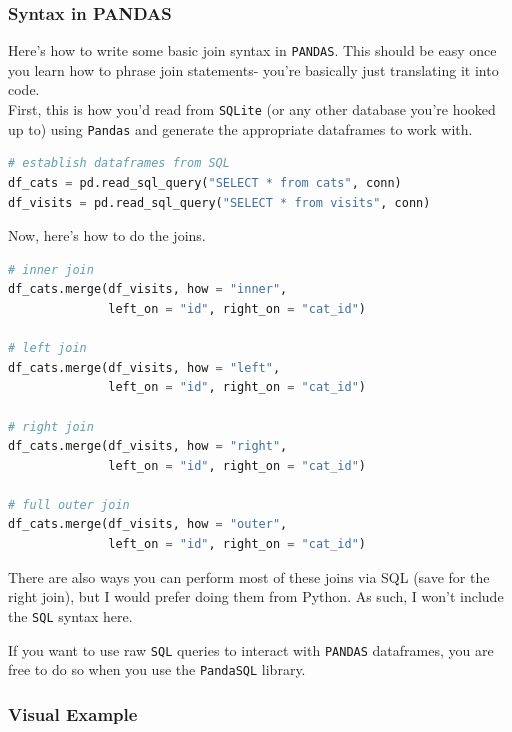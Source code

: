 \documentclass[english, 10pt]{article}
\begin{document}
\subsubsection{Syntax in PANDAS}

Here's how to write some basic join syntax in \texttt{PANDAS}. This should be easy once you learn how to phrase join statements- you're basically just translating it into code.\\

First, this is how you'd read from \texttt{SQLite} (or any other database you're hooked up to) using \texttt{Pandas} and generate the appropriate dataframes to work with.\\

{\centering
\begin{lstlisting}[language=python]
# establish dataframes from SQL
df_cats = pd.read_sql_query("SELECT * from cats", conn)
df_visits = pd.read_sql_query("SELECT * from visits", conn)
\end{lstlisting}
}

\hfill \break Now, here's how to do the joins.

{\centering
\begin{lstlisting}[language=python]
# inner join
df_cats.merge(df_visits, how = "inner",
              left_on = "id", right_on = "cat_id")
              
# left join
df_cats.merge(df_visits, how = "left",
              left_on = "id", right_on = "cat_id")
              
# right join
df_cats.merge(df_visits, how = "right",
              left_on = "id", right_on = "cat_id")
              
# full outer join
df_cats.merge(df_visits, how = "outer",
              left_on = "id", right_on = "cat_id")
\end{lstlisting}
}

There are also ways you can perform most of these joins via SQL (save for the right join), but I would prefer doing them from Python. As such, I won't include the \texttt{SQL} syntax here.

\hfill \break
\begin{tcolorbox}[title=Aside: Raw \texttt{SQL} with Pandas,colframe=black,colback=white,arc=0pt,fonttitle=\bfseries]
If you want to use raw \texttt{SQL} queries to interact with \texttt{PANDAS} dataframes, you are free to do so when you use the \texttt{PandaSQL} library.
\end{tcolorbox}

\subsubsection{Visual Example}
\end{document}
